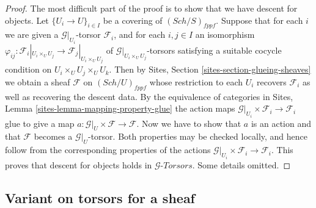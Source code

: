 \documentclass{stacks-project}
\theoremstyle{plain}
\theoremstyle{definition}
\theoremstyle{remark}
\numberwithin{equation}{subsection}
\def\Sch{\mathit{Sch}}
\begin{document}
\begin{proof}
The most difficult part of the proof is to show that
we have descent for objects.
Let $\{U_i \to U\}_{i \in I}$ be a covering of $(\Sch/S)_{fppf}$.
Suppose that for each $i$ we are given a $\mathcal{G}|_{U_i}$-torsor
$\mathcal{F}_i$, and for each $i, j \in I$ an isomorphism
$\varphi_{ij} :
\mathcal{F}_i|_{U_i \times_U U_j} \to \mathcal{F}_j|_{U_i \times_U U_j}$
of $\mathcal{G}|_{U_i \times_U U_j}$-torsors
satisfying a suitable cocycle condition on $U_i \times_U U_j \times_U U_k$.
Then by
Sites, Section \ref{sites-section-glueing-sheaves}
we obtain a sheaf $\mathcal{F}$ on $(\Sch/U)_{fppf}$
whose restriction to each $U_i$ recovers $\mathcal{F}_i$ as well
as recovering the descent data. By the equivalence of categories in
Sites, Lemma \ref{sites-lemma-mapping-property-glue}
the action maps $\mathcal{G}|_{U_i} \times \mathcal{F}_i \to \mathcal{F}_i$
glue to give a map $a : \mathcal{G}|_U \times \mathcal{F} \to \mathcal{F}$.
Now we have to show that $a$ is an action and that $\mathcal{F}$ becomes
a $\mathcal{G}|_U$-torsor. Both properties may be checked locally, and
hence follow from the corresponding properties of the actions
$\mathcal{G}|_{U_i} \times \mathcal{F}_i \to \mathcal{F}_i$.
This proves that descent for objects holds in
$\mathcal{G}\textit{-Torsors}$.
Some details omitted.
\end{proof}



\subsection{Variant on torsors for a sheaf}
\label{subsection-variant-torsor-sheaf}
\end{document}
